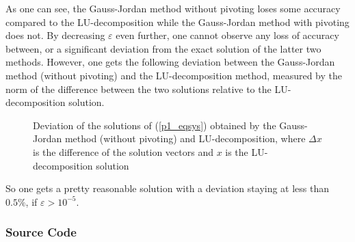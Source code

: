 \documentclass[12pt, a4paper]{article}
\newenvironment{code}{\captionsetup{type=listing}}{}
\begin{document}
  \noindent
  As one can see, the Gauss-Jordan method without pivoting loses some accuracy compared to the LU-decomposition while the Gauss-Jordan method with pivoting does not. By decreasing $\varepsilon$ even further, one cannot observe any loss of accuracy between, or a significant deviation from the exact solution of the latter two methods. However, one gets the following deviation between the Gauss-Jordan method (without pivoting) and the LU-decomposition method, measured by the norm of the difference between the two solutions relative to the LU-decomposition solution.

  \begin{figure}[ht]
    \begin{center}
      
      \caption{Deviation of the solutions of (\ref{p1_eqsys}) obtained by the Gauss-Jordan method (without pivoting) and LU-decomposition, where $\Delta x$ is the difference of the solution vectors and $x$ is the LU-decomposition solution}
    \end{center}
  \end{figure}

  \newpage\noindent
  So one gets a pretty reasonable solution with a deviation staying at less than $0.5 \%$, if $\varepsilon > 10^{-5}$.

  \subsubsection*{Source Code}
  \begin{code}
    \inputminted{python}{linsolve.py}
  \end{code}
  \begin{code}
    \inputminted{python}{problem1.py}
  \end{code}
\end{document}
